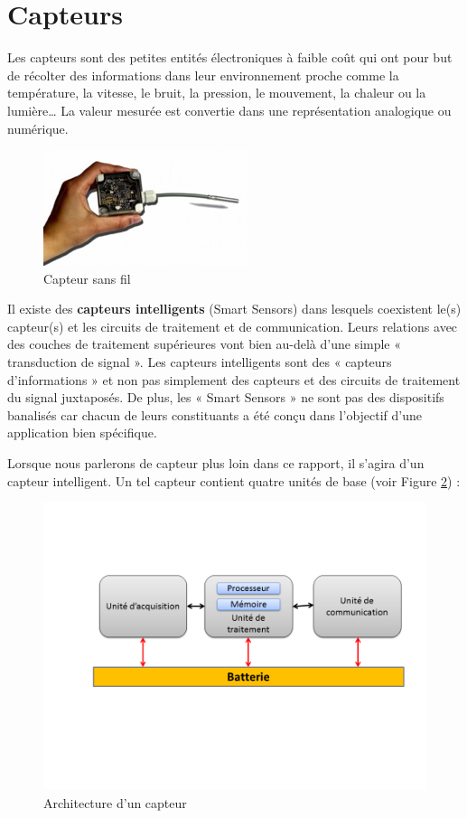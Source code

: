 \section{Capteurs}

Les capteurs sont des petites entités électroniques à faible coût qui ont pour but de récolter des informations dans leur environnement proche comme la température, la vitesse, le bruit, la pression, le mouvement, la chaleur ou la lumière… La valeur mesurée est convertie dans une représentation analogique ou numérique.

\begin{figure}[h]
\centering
\includegraphics[scale=0.5]{Intro/imageCapteur}
\caption{\label{imageCapteur} Capteur sans fil}
\end{figure}

Il existe des \textbf{capteurs intelligents} (Smart Sensors) dans lesquels coexistent le(s) capteur(s) et les circuits de traitement et de communication. Leurs relations avec des couches de traitement supérieures vont bien au-delà d’une simple « transduction de signal ». Les capteurs intelligents sont des « capteurs d’informations » et non pas simplement des capteurs et des circuits de traitement du signal juxtaposés. De plus, les « Smart Sensors » ne sont pas des dispositifs banalisés car chacun de leurs constituants a été conçu dans l’objectif d’une application bien spécifique.

Lorsque nous parlerons de capteur plus loin dans ce rapport, il s'agira d'un capteur intelligent. Un tel capteur contient quatre unités de base (voir Figure \ref{archiCapteur}) : 
 
 \begin{figure}[h]
\centering
\includegraphics[scale=0.5]{Intro/archiCapteur}
\caption{\label{archiCapteur} Architecture d’un capteur}
\end{figure}
 
